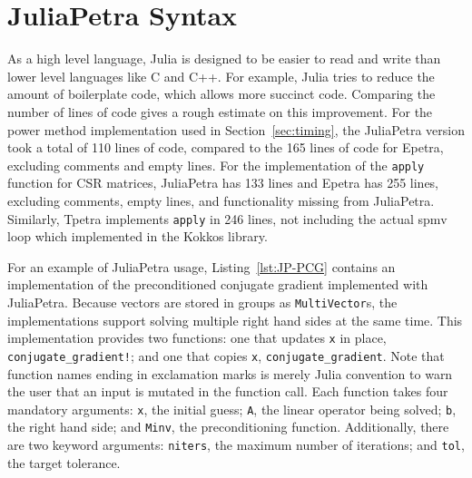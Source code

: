 \documentclass[acmsmall]{acmart}
\newcommand{\snippet}[1]{\lstinline{#1}}
\begin{document}
	\section{JuliaPetra Syntax}
	
	As a high level language, Julia is designed to be easier to read and write than lower level languages like C and C++.
	For example, Julia tries to reduce the amount of boilerplate code, which allows more succinct code.
	Comparing the number of lines of code gives a rough estimate on this improvement.
	For the power method implementation used in Section~\ref{sec:timing},
	the JuliaPetra version took a total of 110 lines of code, compared to the 165 lines of code for Epetra, excluding comments and empty lines.
	For the implementation of the \snippet{apply} function for CSR matrices, JuliaPetra has 133 lines and Epetra has 255 lines, excluding comments, empty lines, and functionality missing from JuliaPetra.
	Similarly, Tpetra implements \snippet{apply} in 246 lines, not including the actual spmv loop which implemented in the Kokkos library.
	
	
	For an example of JuliaPetra usage, Listing~\ref{lst:JP-PCG} contains an implementation of the preconditioned conjugate gradient implemented with JuliaPetra.
	Because vectors are stored in groups as \snippet{MultiVector}s, the implementations support solving multiple right hand sides at the same time.
	This implementation provides two functions: one that updates \snippet{x} in place, \snippet{conjugate_gradient!}; and one that copies \snippet{x}, \snippet{conjugate_gradient}.
	Note that function names ending in exclamation marks is merely Julia convention to warn the user that an input is mutated in the function call.
	Each function takes four mandatory arguments: \snippet{x}, the initial guess; \snippet{A}, the linear operator being solved; \snippet{b}, the right hand side; and \snippet{Minv}, the preconditioning function.
	Additionally, there are two keyword arguments: \snippet{niters}, the maximum number of iterations; and \snippet{tol}, the target tolerance.
	
\end{document}
